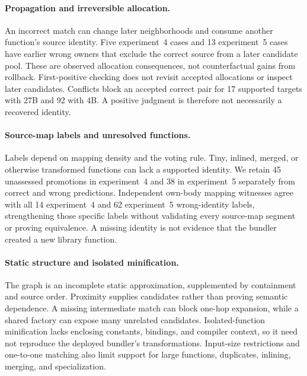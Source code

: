 \paragraph{Propagation and irreversible allocation.}
An incorrect match can change later neighborhoods and consume another function's source identity. Five experiment~4 cases and 13 experiment~5 cases have earlier wrong owners that exclude the correct source from a later candidate pool. These are observed allocation consequences, not counterfactual gains from rollback. First-positive checking does not revisit accepted allocations or inspect later candidates. Conflicts block an accepted correct pair for 17 supported targets with 27B and 92 with 4B. A positive judgment is therefore not necessarily a recovered identity.

\paragraph{Source-map labels and unresolved functions.}
Labels depend on mapping density and the voting rule. Tiny, inlined, merged, or otherwise transformed functions can lack a supported identity. We retain 45 unassessed promotions in experiment~4 and 38 in experiment~5 separately from correct and wrong predictions. Independent own-body mapping witnesses agree with all 14 experiment~4 and 62 experiment~5 wrong-identity labels, strengthening those specific labels without validating every source-map segment or proving equivalence. A missing identity is not evidence that the bundler created a new library function.

\paragraph{Static structure and isolated minification.}
The graph is an incomplete static approximation, supplemented by containment and source order. Proximity supplies candidates rather than proving semantic dependence. A missing intermediate match can block one-hop expansion, while a shared factory can expose many unrelated candidates. Isolated-function minification lacks enclosing constants, bindings, and compiler context, so it need not reproduce the deployed bundler's transformations. Input-size restrictions and one-to-one matching also limit support for large functions, duplicates, inlining, merging, and specialization.

